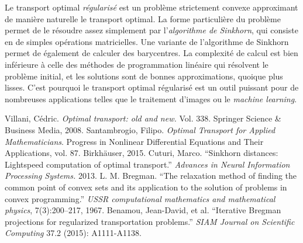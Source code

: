 Le transport optimal \emph{régularisé} est un problème strictement convexe approximant de manière naturelle le transport optimal. La forme particulière du problème permet de le résoudre assez simplement par l'\emph{algorithme de Sinkhorn}, qui consiste en de simples opérations matricielles.
Une variante de l'algorithme de Sinkhorn permet de également de calculer des barycentres.
La complexité de calcul est bien inférieure à celle des méthodes de programmation linéaire qui résolvent le problème initial, et les solutions sont de bonnes approximations, quoique plus lisses.
C'est pourquoi le transport optimal régularisé est un outil puissant pour de nombreuses applications telles que le traitement d'images ou le \emph{machine learning}.

\medskip
\begin{thebibliography}{99}
Villani, Cédric. \textit{Optimal transport: old and new.} Vol. 338. Springer Science \& Business Media, 2008.
Santambrogio, Filipo. \textit{Optimal Transport for Applied Mathematicians}. Progress in Nonlinear Differential Equations and Their Applications, vol. 87. Birkhäuser, 2015.
Cuturi, Marco. ``Sinkhorn distances: Lightspeed computation of optimal transport.'' \textit{Advances in Neural Information Processing Systems.} 2013.
L. M. Bregman. ``The relaxation method of finding the common point of
convex sets and its application to the solution of problems in convex programming.''
\textit{USSR computational mathematics and mathematical physics},
7(3):200–217, 1967.
Benamou, Jean-David, et al. ``Iterative Bregman projections for regularized transportation problems.'' \textit{SIAM Journal on Scientific Computing} 37.2 (2015): A1111-A1138.
\end{thebibliography}

